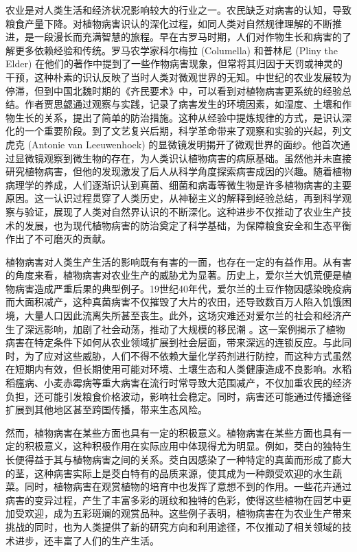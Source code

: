 \documentclass[AutoFakeBold]{LZUThesis-PgD&PhD}
\begin{document}
	农业是对人类生活和经济状况影响较大的行业之一。农民缺乏对病害的认知，导致粮食产量下降\cite{nandhini2021plantleaf}。对植物病害识认的深化过程，如同人类对自然规律理解的不断推进，是一段漫长而充满智慧的旅程。早在古罗马时期，人们对作物生长和病害的了解更多依赖经验和传统。罗马农学家科尔梅拉 (Columella) 和普林尼 (Pliny the Elder) 在他们的著作中提到了一些作物病害现象，但常将其归因于天罚或神灵的干预，这种朴素的识认反映了当时人类对微观世界的无知\cite{columella1941agriculture}。中世纪的农业发展较为停滞，但到中国北魏时期的《齐民要术》中，可以看到对植物病害更系统的经验总结。作者贾思勰通过观察与实践，记录了病害发生的环境因素，如湿度、土壤和作物生长的关系，提出了简单的防治措施\cite{jia535qimin}。这种从经验中提炼规律的方式，是识认深化的一个重要阶段。到了文艺复兴后期，科学革命带来了观察和实验的兴起，列文虎克 (Antonie van Leeuwenhoek) 的显微镜发明揭开了微观世界的面纱。他首次通过显微镜观察到微生物的存在，为人类识认植物病害的病原基础。虽然他并未直接研究植物病害，但他的发现激发了后人从科学角度探索病害成因的兴趣\cite{leeuwenhoek1683observations}。随着植物病理学的养成，人们逐渐识认到真菌、细菌和病毒等微生物是许多植物病害的主要原因\cite{agrios2005plant}。这一认识过程贯穿了人类历史，从神秘主义的解释到经验总结，再到科学观察与验证，展现了人类对自然界认识的不断深化。这种进步不仅推动了农业生产技术的发展，也为现代植物病害的防治奠定了科学基础，为保障粮食安全和生态平衡作出了不可磨灭的贡献。


	植物病害对人类生产生活的影响既有有害的一面，也存在一定的有益作用。从有害的角度来看，植物病害对农业生产的威胁尤为显著。历史上，爱尔兰大饥荒便是植物病害造成严重后果的典型例子。19世纪40年代，爱尔兰的土豆作物因感染晚疫病而大面积减产，这种真菌病害不仅摧毁了大片的农田，还导致数百万人陷入饥饿困境，大量人口因此流离失所甚至丧生。此外，这场灾难还对爱尔兰的社会和经济产生了深远影响，加剧了社会动荡，推动了大规模的移民潮 \cite{ograda2009great}。这一案例揭示了植物病害在特定条件下如何从农业领域扩展到社会层面，带来深远的连锁反应。与此同时，为了应对这些威胁，人们不得不依赖大量化学药剂进行防控，而这种方式虽然在短期内有效，但长期使用可能对环境、土壤生态和人类健康造成不良影响。水稻稻瘟病、小麦赤霉病等重大病害在流行时常导致大范围减产，不仅加重农民的经济负担，还可能引发粮食价格波动，影响社会稳定。同时，病害还可能通过传播途径扩展到其他地区甚至跨国传播，带来生态风险。
	
	
	然而，植物病害在某些方面也具有一定的积极意义。植物病害在某些方面也具有一定的积极意义，这种积极作用在实际应用中体现得尤为明显。例如，茭白的独特生长便得益于其与植物病害之间的关系。茭白因感染了一种特定的真菌而形成了膨大的茎，这种病害实际上是茭白特有的品质来源，使其成为一种颇受欢迎的水生蔬菜。同时，植物病害在观赏植物的培育中也发挥了意想不到的作用。一些花卉通过病害的变异过程，产生了丰富多彩的斑纹和独特的色彩，使得这些植物在园艺中更加受欢迎，成为五彩斑斓的观赏品种。这些例子表明，植物病害在为农业生产带来挑战的同时，也为人类提供了新的研究方向和利用途径，不仅推动了相关领域的技术进步，还丰富了人们的生产生活。
	
\end{document}
